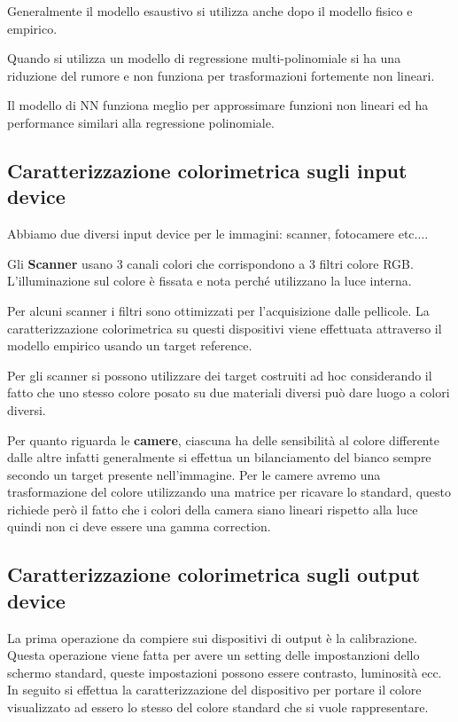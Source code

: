 Generalmente il modello esaustivo si utilizza anche dopo il modello fisico e empirico.
\begin{nota}
    Quando si utilizza un modello di regressione multi-polinomiale si ha una 
    riduzione del rumore e non funziona per trasformazioni fortemente non lineari.
\end{nota}
\begin{nota}
    Il modello di NN funziona meglio per approssimare funzioni non lineari ed ha
    performance similari alla regressione polinomiale.
\end{nota}
\subsection{Caratterizzazione colorimetrica sugli input device}
Abbiamo due diversi input device per le immagini: scanner, fotocamere etc$\dots$.

Gli \textbf{Scanner} usano $3$ canali colori che corrispondono a 3 filtri colore 
RGB. L'illuminazione sul colore è fissata e nota perché utilizzano la luce interna.

Per alcuni scanner i filtri sono ottimizzati per l'acquisizione dalle pellicole.
La caratterizzazione colorimetrica su questi dispositivi viene effettuata attraverso
il modello empirico usando un target reference.

Per gli scanner si possono utilizzare dei target costruiti ad hoc considerando il 
fatto che uno stesso colore posato su due materiali diversi può dare luogo a colori
diversi.

Per quanto riguarda le \textbf{camere}, ciascuna ha delle sensibilità al colore
differente dalle altre infatti generalmente si effettua un bilanciamento del bianco
sempre secondo un target presente nell'immagine. Per le camere avremo una 
trasformazione del colore utilizzando una matrice per ricavare lo standard, questo
richiede però il fatto che i colori della camera siano lineari rispetto alla luce
quindi non ci deve essere una gamma correction.

\subsection{Caratterizzazione colorimetrica sugli output device}
La prima operazione da compiere sui dispositivi di output è la calibrazione. 
Questa operazione viene fatta per avere un setting delle impostanzioni dello schermo 
standard, queste impostazioni possono essere contrasto, luminosità ecc. In seguito 
si effettua la caratterizzazione del dispositivo per portare il colore visualizzato 
ad essero lo stesso del colore standard che si vuole rappresentare.

